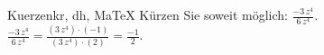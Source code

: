 \begin{MAufgabe}{Kuerzen}{kr, dh, MaTeX}
K\"urzen Sie soweit m\"oglich: $\frac{- 3\, z^4}{6\, z^4}$.\\ 
\ifLsg\MLoesung
\quad $\frac{- 3\, z^4}{6\, z^4}=\frac{(3\, z^4)\cdot(-1)}{(3\, z^4)\cdot(2)}=\frac{-1}{2}$.\else\relax\fi
 \end{MAufgabe}